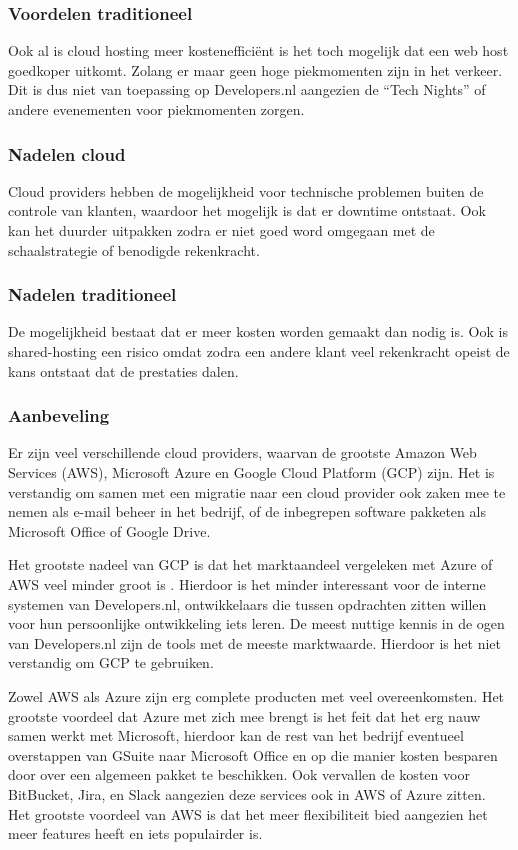 \subsubsection{Voordelen traditioneel} 
Ook al is cloud hosting meer kostenefficiënt is het toch mogelijk dat een web host goedkoper uitkomt. Zolang er maar geen hoge piekmomenten zijn in het verkeer. Dit is dus niet van toepassing op Developers.nl aangezien de \enquote{Tech Nights} of andere evenementen voor piekmomenten zorgen. 

\subsubsection{Nadelen cloud}
Cloud providers hebben de mogelijkheid voor technische problemen buiten de controle van klanten, waardoor het mogelijk is dat er downtime ontstaat. Ook kan het duurder uitpakken zodra er niet goed word omgegaan met de schaalstrategie of benodigde rekenkracht.

\subsubsection{Nadelen traditioneel}
De mogelijkheid bestaat dat er meer kosten worden gemaakt dan nodig is. Ook is shared-hosting een risico omdat zodra een andere klant veel rekenkracht opeist de kans ontstaat dat de prestaties dalen.

\subsubsection{Aanbeveling}
Er zijn veel verschillende cloud providers, waarvan de grootste Amazon Web Services (AWS), Microsoft Azure en Google Cloud Platform (GCP) zijn. Het is verstandig om samen met een migratie naar een cloud provider ook zaken mee te nemen als e-mail beheer in het bedrijf, of de inbegrepen software pakketen als Microsoft Office of Google Drive.

Het grootste nadeel van GCP is dat het marktaandeel vergeleken met Azure of AWS veel minder groot is \parencite{MarketShare}. Hierdoor is het minder interessant voor de interne systemen van Developers.nl, ontwikkelaars die tussen opdrachten zitten willen voor hun persoonlijke ontwikkeling iets leren. De meest nuttige kennis in de ogen van Developers.nl zijn de tools met de meeste marktwaarde. Hierdoor is het niet verstandig om GCP te gebruiken.

Zowel AWS als Azure zijn erg complete producten met veel overeenkomsten. Het grootste voordeel dat Azure met zich mee brengt is het feit dat het erg nauw samen werkt met Microsoft, hierdoor kan de rest van het bedrijf eventueel overstappen van GSuite naar Microsoft Office en op die manier kosten besparen door over een algemeen pakket te beschikken. Ook vervallen de kosten voor BitBucket, Jira, en Slack aangezien deze services ook in AWS of Azure zitten. Het grootste voordeel van AWS is dat het meer flexibiliteit bied aangezien het meer features heeft en iets populairder is.

